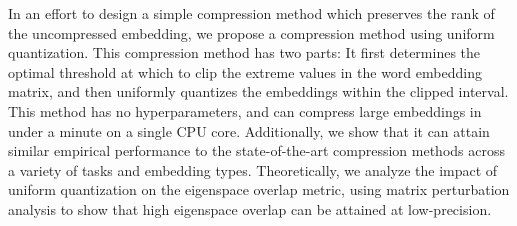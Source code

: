 In an effort to design a simple compression method which preserves the rank of the uncompressed embedding, we propose a compression method using uniform quantization.
This compression method has two parts: It first determines the optimal threshold at which to clip the extreme values in the word embedding matrix, and then uniformly quantizes the embeddings within the clipped interval.
This method has no hyperparameters, and can compress large embeddings in under a minute on a single CPU core.
Additionally, we show that it can attain similar empirical performance to the state-of-the-art compression methods across a variety of tasks and embedding types.
Theoretically, we analyze the impact of uniform quantization on the eigenspace overlap metric, using matrix perturbation analysis to show that high eigenspace overlap can be attained at low-precision.

